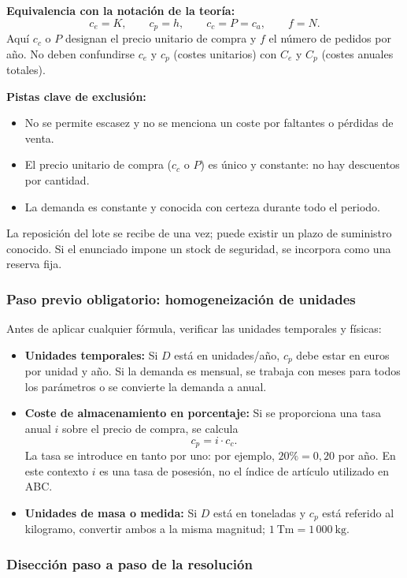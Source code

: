 \documentclass[11pt,a4paper]{article}
\begin{document}
\textbf{Equivalencia con la notación de la teoría:}
\[
    c_e=K,\qquad c_p=h,\qquad c_c=P=c_a,\qquad f=N.
\]
Aquí $c_c$ o $P$ designan el precio unitario de compra y $f$ el número de pedidos por año. No deben confundirse $c_e$ y $c_p$ (costes unitarios) con $C_e$ y $C_p$ (costes anuales totales).

\textbf{Pistas clave de exclusión:}
\begin{itemize}
    \item No se permite escasez y no se menciona un coste por faltantes o pérdidas de venta.
    \item El precio unitario de compra ($c_c$ o $P$) es único y constante: no hay descuentos por cantidad.
    \item La demanda es constante y conocida con certeza durante todo el periodo.
\end{itemize}
La reposición del lote se recibe de una vez; puede existir un plazo de suministro conocido. Si el enunciado impone un stock de seguridad, se incorpora como una reserva fija.

\subsubsection{Paso previo obligatorio: homogeneización de unidades}
Antes de aplicar cualquier fórmula, verificar las unidades temporales y físicas:
\begin{itemize}
    \item \textbf{Unidades temporales:} Si $D$ está en unidades/año, $c_p$ debe estar en euros por unidad y año. Si la demanda es mensual, se trabaja con meses para todos los parámetros o se convierte la demanda a anual.
    \item \textbf{Coste de almacenamiento en porcentaje:} Si se proporciona una tasa anual $i$ sobre el precio de compra, se calcula
          \[
              c_p=i\cdot c_c.
          \]
          La tasa se introduce en tanto por uno: por ejemplo, $20\%=0{,}20$ por año. En este contexto $i$ es una tasa de posesión, no el índice de artículo utilizado en ABC.
    \item \textbf{Unidades de masa o medida:} Si $D$ está en toneladas y $c_p$ está referido al kilogramo, convertir ambos a la misma magnitud; $1\ \text{Tm}=1\,000\ \text{kg}$.
\end{itemize}

\subsubsection{Disección paso a paso de la resolución}
\end{document}
